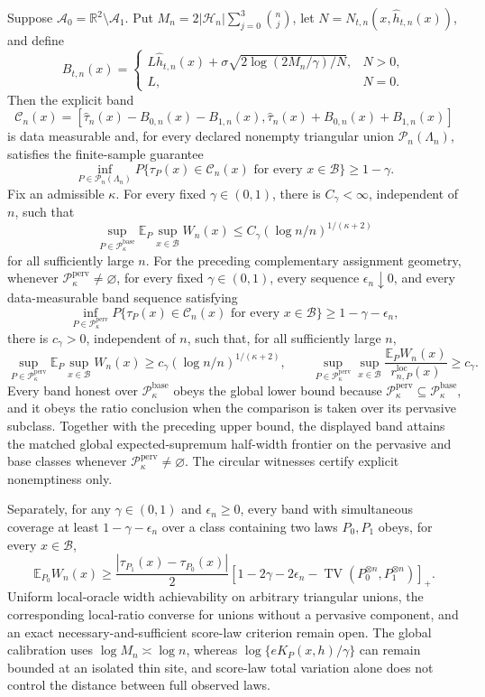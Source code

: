 Suppose \(\mathcal A_0=\mathbb R^2\setminus\mathcal A_1\). Put \(M_n=2|\mathcal H_n|\sum_{j=0}^3\binom nj\), let \(N=N_{t,n}(x,\widehat h_{t,n}(x))\), and define
\[
 B_{t,n}(x)=
 \begin{cases}
 L\widehat h_{t,n}(x)+\sigma\sqrt{2\log(2M_n/\gamma)/N},&N>0,\\
 L,&N=0.
 \end{cases}
\]
Then the explicit band
\[
 \mathcal C_n(x)=
 \left[\widehat\tau_n(x)-B_{0,n}(x)-B_{1,n}(x),
 \widehat\tau_n(x)+B_{0,n}(x)+B_{1,n}(x)\right]
\]
is data measurable and, for every declared nonempty triangular union \(\mathcal P_n(\Lambda_n)\), satisfies the finite-sample guarantee
\[
 \inf_{P\in\mathcal P_n(\Lambda_n)}P\{\tau_P(x)\in\mathcal C_n(x)\text{ for every }x\in\mathcal B\}\ge1-\gamma.
\]
Fix an admissible \(\kappa\).  For every fixed \(\gamma\in(0,1)\), there is \(C_\gamma<\infty\), independent of \(n\), such that
\[
 \sup_{P\in\mathcal P_{\kappa}^{\mathrm{base}}}
 \mathbb E_P\sup_{x\in\mathcal B}W_n(x)
 \le C_\gamma(\log n/n)^{1/(\kappa+2)}
\]
for all sufficiently large \(n\). For the preceding complementary assignment geometry, whenever \(\mathcal P_{\kappa}^{\mathrm{perv}}\ne\varnothing\), for every fixed \(\gamma\in(0,1)\), every sequence \(\epsilon_n\downarrow0\), and every data-measurable band sequence satisfying
\[
 \inf_{P\in\mathcal P_{\kappa}^{\mathrm{perv}}}
 P\{\tau_P(x)\in\mathcal C_n(x)\text{ for every }x\in\mathcal B\}
 \ge1-\gamma-\epsilon_n,
\]
there is \(c_\gamma>0\), independent of \(n\), such that, for all sufficiently large \(n\),
\[
 \sup_{P\in\mathcal P_{\kappa}^{\mathrm{perv}}}
 \mathbb E_P\sup_{x\in\mathcal B}W_n(x)
 \ge c_\gamma(\log n/n)^{1/(\kappa+2)},
 \qquad
 \sup_{P\in\mathcal P_{\kappa}^{\mathrm{perv}}}\sup_{x\in\mathcal B}
 \frac{\mathbb E_PW_n(x)}{r_{n,P}^{\mathrm{loc}}(x)}
 \ge c_\gamma.
\]
Every band honest over \(\mathcal P_{\kappa}^{\mathrm{base}}\) obeys the global lower bound because \(\mathcal P_{\kappa}^{\mathrm{perv}}\subseteq\mathcal P_{\kappa}^{\mathrm{base}}\), and it obeys the ratio conclusion when the comparison is taken over its pervasive subclass. Together with the preceding upper bound, the displayed band attains the matched global expected-supremum half-width frontier on the pervasive and base classes whenever \(\mathcal P_{\kappa}^{\mathrm{perv}}\ne\varnothing\). The circular witnesses certify explicit nonemptiness only.

Separately, for any \(\gamma\in(0,1)\) and \(\epsilon_n\ge0\), every band with simultaneous coverage at least \(1-\gamma-\epsilon_n\) over a class containing two laws \(P_0,P_1\) obeys, for every \(x\in\mathcal B\),
\[
 \mathbb E_{P_0}W_n(x)\ge\frac{|\tau_{P_1}(x)-\tau_{P_0}(x)|}{2}
 \left[1-2\gamma-2\epsilon_n-
 \operatorname{TV}(P_0^{\otimes n},P_1^{\otimes n})\right]_+.
\]
Uniform local-oracle width achievability on arbitrary triangular unions, the corresponding local-ratio converse for unions without a pervasive component, and an exact necessary-and-sufficient score-law criterion remain open. The global calibration uses \(\log M_n\asymp\log n\), whereas \(\log\{eK_P(x,h)/\gamma\}\) can remain bounded at an isolated thin site, and score-law total variation alone does not control the distance between full observed laws.